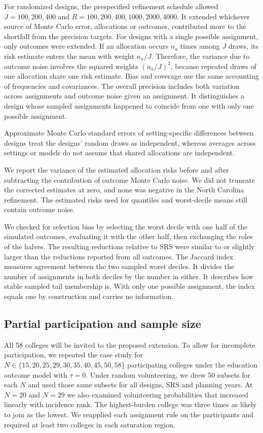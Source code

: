\documentclass[11pt]{article}
\begin{document}
\iffullsi
For randomized designs, the prespecified refinement schedule allowed $J=100,200,400$ and $R=100,200,400,1000,2000,4000$. It extended whichever source of Monte Carlo error, allocations or outcomes, contributed more to the shortfall from the precision targets. For designs with a single possible assignment, only outcomes were extended. If
an allocation occurs \(n_a\) times among \(J\) draws, its risk estimate
enters the mean with weight \(n_a/J\). Therefore, the variance due to outcome noise involves the squared weights \((n_a/J)^2\), because repeated draws of one allocation share one risk estimate. Bias and coverage use the same accounting of frequencies and covariances. The overall precision includes both variation across assignments and outcome noise given an assignment. It distinguishes a design whose sampled assignments happened to coincide from one with only one possible assignment.
\fi

 Approximate Monte Carlo standard errors of setting-specific differences between designs treat the designs' random draws as independent, whereas averages across settings or models do not assume that shared allocations are independent.

We report the variance of the estimated allocation risks before and after
subtracting the contribution of outcome Monte Carlo noise. We did not
truncate the corrected estimates at zero, and none was negative in the
North Carolina refinement. The estimated risks used for quantiles and
worst-decile means still contain outcome noise.

We checked for selection bias by selecting the worst decile with one half
of the simulated outcomes, evaluating it with the other half, then
exchanging the roles of the halves. The resulting reductions relative to
SRS were similar to or slightly larger than the reductions reported from
all outcomes. The Jaccard index measures agreement between the two
sampled worst deciles. It divides the number of assignments in both
deciles by the number in either. It describes how stable sampled tail membership is. With only one possible assignment, the index equals one by
construction and carries no information.


\subsection{Partial participation and sample size}\label{partial-participation-methods}


All 58 colleges will be invited to the proposed extension. To allow for
incomplete participation, we repeated the case study for
$N \in \{15,20,25,29,30,35,40,45,50,58\}$ participating colleges
under the education outcome model with $\tau=0$. Under random
volunteering, we drew 50 subsets for each $N$ and used those same
subsets for all designs, SRS and planning years. At $N=20$ and $N=29$
we also examined volunteering probabilities that increased linearly
with incidence rank. The highest-burden college was three times as
likely to join as the lowest. We reapplied each assignment rule on the
participants and required at least two colleges in each saturation region.
\end{document}
